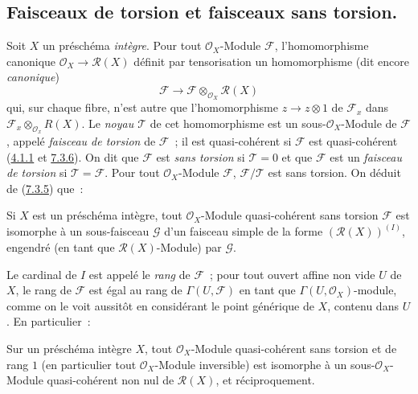 \subsection{Faisceaux de torsion et faisceaux sans torsion.}
\label{subsection:I.7.4-fr}

\begin{env}[7.4.1]
\label{I.7.4.1-fr}
Soit $X$ un préschéma \emph{intègre}. Pour tout $\mathscr{O}_X$-Module
$\mathscr{F}$, l'homomorphisme canonique
$\mathscr{O}_X\to\mathscr{R}(X)$ définit par tensorisation un homomorphisme
(dit encore \emph{canonique})
\[
  \mathscr{F}\to
  \mathscr{F}\otimes_{\mathscr{O}_X}\mathscr{R}(X)
\]
qui, sur chaque fibre, n'est autre que l'homomorphisme $z\to z\otimes 1$ de
$\mathscr{F}_x$ dans
$\mathscr{F}_x\otimes_{\mathscr{O}_x}R(X)$. Le \emph{noyau $\mathscr{T}$}
de cet homomorphisme est un sous-$\mathscr{O}_X$-Module de $\mathscr{F}$,
appelé \emph{faisceau de torsion} de $\mathscr{F}$~; il est quasi-cohérent si
$\mathscr{F}$ est quasi-cohérent
(\hyperref[I.4.1.1-fr]{4.1.1} et \hyperref[I.7.3.6-fr]{7.3.6}). On dit que
$\mathscr{F}$ est \emph{sans torsion} si $\mathscr{T}=0$ et que
$\mathscr{F}$ est un \emph{faisceau de torsion} si
$\mathscr{T}=\mathscr{F}$. Pour tout $\mathscr{O}_X$-Module $\mathscr{F}$,
$\mathscr{F}/\mathscr{T}$ est sans torsion. On déduit de
(\hyperref[I.7.3.5-fr]{7.3.5}) que~:
\end{env}

\begin{proposition}[7.4.2]
\label{I.7.4.2-fr}
Si $X$ est un préschéma intègre, tout $\mathscr{O}_X$-Module quasi-cohérent
sans torsion $\mathscr{F}$ est isomorphe à un sous-faisceau $\mathscr{G}$
d'un faisceau simple de la forme $(\mathscr{R}(X))^{(I)}$, engendré (en tant
que $\mathscr{R}(X)$-Module) par $\mathscr{G}$.
\end{proposition}

Le cardinal de $I$ est appelé le \emph{rang} de $\mathscr{F}$~; pour tout
ouvert affine non vide $U$ de $X$, le rang de $\mathscr{F}$ est égal au rang
de $\Gamma(U,\mathscr{F})$ en tant que $\Gamma(U,\mathscr{O}_X)$-module,
comme on le voit aussitôt en considérant le point générique de $X$, contenu
dans $U$. En particulier~:

\begin{corollary}[7.4.3]
\label{I.7.4.3-fr}
Sur un préschéma intègre $X$, tout $\mathscr{O}_X$-Module quasi-cohérent sans
torsion et de rang $1$ (en particulier tout $\mathscr{O}_X$-Module
inversible) est isomorphe à un sous-$\mathscr{O}_X$-Module quasi-cohérent non nul de
$\mathscr{R}(X)$, et réciproquement.
\end{corollary}


